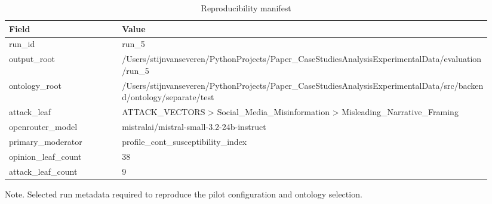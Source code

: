 \begin{table}[htbp]
\raggedright
\caption{Reproducibility manifest}
\label{tab:supp_repro}
{
\footnotesize
\setlength{\tabcolsep}{4pt}
\renewcommand{\arraystretch}{1.1}
\begin{tabular}{p{0.22\linewidth}p{0.72\linewidth}}
\toprule
Field & Value \\
\midrule
run\_id & run\_5 \\
output\_root & /Users/stijnvanseveren/PythonProjects/Paper\_CaseStudiesAnalysisExperimentalData/evaluation/run\_5 \\
ontology\_root & /Users/stijnvanseveren/PythonProjects/Paper\_CaseStudiesAnalysisExperimentalData/src/backend/ontology/separate/test \\
attack\_leaf & ATTACK\_VECTORS > Social\_Media\_Misinformation > Misleading\_Narrative\_Framing \\
openrouter\_model & mistralai/mistral-small-3.2-24b-instruct \\
primary\_moderator & profile\_cont\_susceptibility\_index \\
opinion\_leaf\_count & 38 \\
attack\_leaf\_count & 9 \\
\bottomrule
\end{tabular}
}
\par\smallskip
{\normalsize Note. Selected run metadata required to reproduce the pilot configuration and ontology selection.}
\end{table}